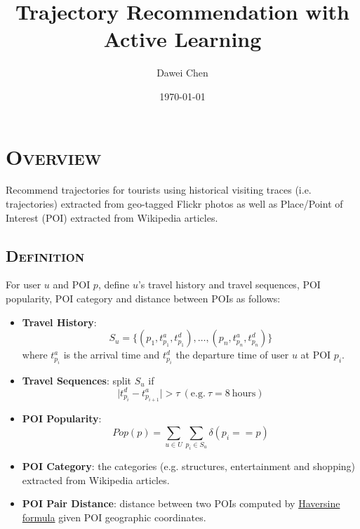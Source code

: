 \documentclass[11pt, a4paper]{article}
\title{Trajectory Recommendation with Active Learning}
\author{Dawei Chen}
\date{\today}
\begin{document}
\maketitle

\section{\textsc{Overview}}
Recommend trajectories for tourists using historical visiting traces (i.e. trajectories) extracted from geo-tagged Flickr photos 
as well as Place/Point of Interest (POI) extracted from Wikipedia articles.

\subsection{\textsc{Definition}}
For user $u$ and POI $p$, define $u$'s travel history and travel sequences, 
POI popularity, POI category and distance between POIs as follows\cite{lim15}:
\begin{itemize}
\item \textbf{Travel History}:
      \begin{equation*}
      S_u = \{(p_1, t_{p_1}^a, t_{p_1}^d), \dots, (p_n, t_{p_n}^a, t_{p_n}^d)\}
      \end{equation*}
      where $t_{p_i}^a$ is the arrival time and $t_{p_i}^d$ the departure time of user $u$ at POI $p_i$.
\item \textbf{Travel Sequences}: split $S_u$ if
      \begin{equation*}
      \lvert t_{p_i}^d - t_{p_{i+1}}^a \rvert > \tau ~(\text{e.g.}~ \tau = 8 ~\text{hours})
      \end{equation*}
\item \textbf{POI Popularity}:
      \begin{equation*}
      Pop(p) = \sum_{u \in U} \sum_{p_i \in S_u} \delta(p_i == p)
      \end{equation*}
\item \textbf{POI Category}: the categories (e.g. structures, entertainment and shopping) extracted from Wikipedia articles.
\item \textbf{POI Pair Distance}: distance between two POIs computed by
      \href{https://en.wikipedia.org/wiki/Great-circle\_distance#Computational\_formulas}{Haversine formula}
      given POI geographic coordinates.
\end{itemize}
\end{document}
